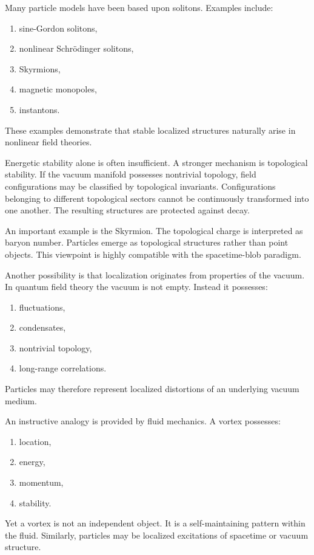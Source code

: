 Many particle models have been based upon solitons.
Examples include:
\begin{enumerate}
\item sine-Gordon solitons,
\item nonlinear Schrödinger solitons,
\item Skyrmions,
\item magnetic monopoles,
\item instantons.
\end{enumerate}
These examples demonstrate that stable localized structures naturally
arise in nonlinear field theories.

Energetic stability alone is often insufficient.
A stronger mechanism is topological stability.
If the vacuum manifold
possesses nontrivial topology, field configurations may be classified by
topological invariants.
Configurations belonging to different topological sectors cannot be
continuously transformed into one another.
The resulting structures are protected against decay.

An important example is the Skyrmion.
The topological charge is interpreted as baryon number.
Particles emerge as topological structures rather than point objects.
This viewpoint is highly compatible with the spacetime-blob paradigm.

Another possibility is that localization originates from properties of
the vacuum.
In quantum field theory the vacuum is not empty.
Instead it possesses:
\begin{enumerate}
\item fluctuations,
\item condensates,
\item nontrivial topology,
\item long-range correlations.
\end{enumerate}
Particles may therefore represent localized distortions of an underlying
vacuum medium.

An instructive analogy is provided by fluid mechanics.
A vortex possesses:
\begin{enumerate}
\item location,
\item energy,
\item momentum,
\item stability.
\end{enumerate}
Yet a vortex is not an independent object.
It is a self-maintaining pattern within the fluid.
Similarly, particles may be localized excitations of spacetime or vacuum
structure.

